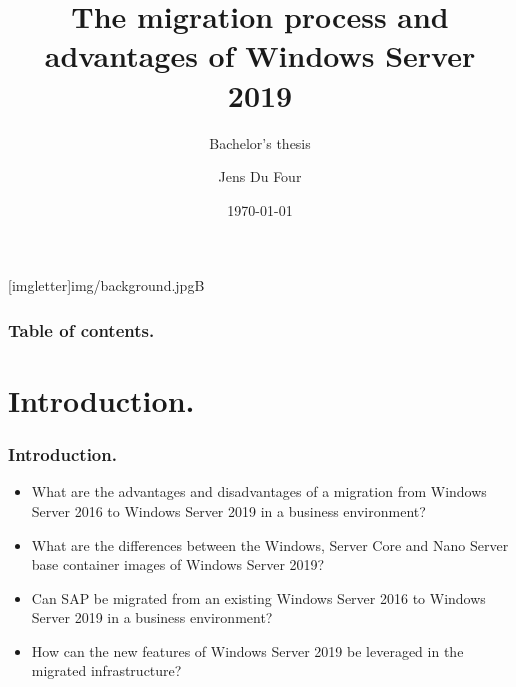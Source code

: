 \documentclass[aspectratio=169]{beamer}
\title{The migration process and advantages of Windows Server 2019}
\subtitle{Bachelor's thesis}
\author{Jens Du Four}
\date{\today}
\begin{document}
{
    [imgletter]{img/background.jpg}{B}  
    \begin{frame}
    \maketitle
    \end{frame}
}

\begin{frame}
  \frametitle{Table of contents.}
  \tableofcontents
\end{frame}
\section{Introduction.}
\begin{frame}
\frametitle{Introduction.}  
\vspace*{\fill}
    \begin{itemize}
        \item[] {What are the advantages and disadvantages of a migration from Windows Server 2016 to Windows Server 2019 in a business environment?}
        \item[] {What are the differences between the Windows, Server Core and Nano Server base container images of Windows Server 2019?}
        \item[] {Can SAP be migrated from an existing Windows Server 2016 to Windows Server 2019 in a business environment?}
        \item[] {How can the new features of Windows Server 2019 be leveraged in the migrated infrastructure?}
    \end{itemize}
\vspace*{\fill}

\end{frame}
\end{document}
